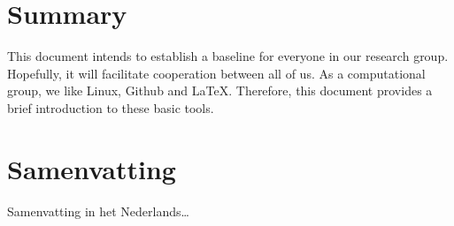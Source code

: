 \chapter*{Summary}


This document intends to establish a baseline for everyone in our research group. Hopefully, it will facilitate cooperation between all of us. As a computational group, we like Linux, Github and \LaTeX. Therefore, this document provides a brief introduction to these basic tools.

\chapter*{Samenvatting}

{


Samenvatting in het Nederlands\ldots

}

